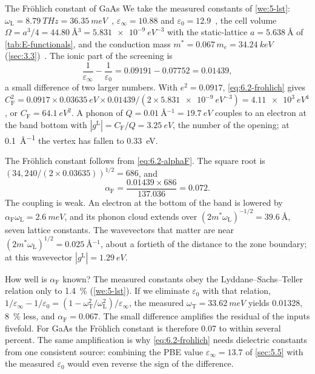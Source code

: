 \begin{workedexample}{The Fr\"ohlich constant of GaAs}\label{we:6-frohlich}
We take the measured constants of \cref{we:5-lst}: $\omega_{\mathrm{L}} = \SI{8.79}{THz} = \SI{36.35}{meV}$~\cite{strauch1990phonon}, $\varepsilon_\infty = 10.88$ and $\varepsilon_0 = 12.9$~\cite{lockwood2005optical}, the cell volume $\Omega = a^3/4 = \SI{44.80}{\angstrom^3} = \SI{5.831e-9}{eV^{-3}}$ with the static-lattice $a = \SI{5.638}{\angstrom}$ of \cref{tab:E-functionals}, and the conduction mass $m^* = 0.067\,m_e = \SI{34.24}{keV}$ (\cref{sec:3.3})~\cite{vurgaftman2001band}. The ionic part of the screening is
\begin{equation*}
  \frac{1}{\varepsilon_\infty} - \frac{1}{\varepsilon_0} = 0.09191 - 0.07752 = 0.01439 ,
\end{equation*}
a small difference of two larger numbers. With $e^2 = 0.0917$, \cref{eq:6.2-frohlich} gives $C_{\mathrm{F}}^2 = 0.0917\times\SI{0.03635}{eV}\times0.01439/(2\times\SI{5.831e-9}{eV^{-3}}) = \SI{4.11e3}{eV^4}$, or $C_{\mathrm{F}} = \SI{64.1}{eV^2}$. A phonon of $Q = \SI{0.01}{\angstrom^{-1}} = \SI{19.7}{eV}$ couples to an electron at the band bottom with $|g^{\mathrm{L}}| = C_{\mathrm{F}}/Q = \SI{3.25}{eV}$, the number of the opening; at \SI{0.1}{\angstrom^{-1}} the vertex has fallen to \SI{0.33}{eV}.

The Fr\"ohlich constant follows from \cref{eq:6.2-alphaF}. The square root is $(34{,}240/(2\times0.03635))^{1/2} = 686$, and
\begin{equation*}
  \alpha_{\mathrm{F}} = \frac{0.01439\times686}{137.036} = 0.072 .
\end{equation*}
The coupling is weak. An electron at the bottom of the band is lowered by $\alpha_{\mathrm{F}}\omega_{\mathrm{L}} = \SI{2.6}{meV}$, and its phonon cloud extends over $(2m^*\omega_{\mathrm{L}})^{-1/2} = \SI{39.6}{\angstrom}$, seven lattice constants. The wavevectors that matter are near $(2m^*\omega_{\mathrm{L}})^{1/2} = \SI{0.025}{\angstrom^{-1}}$, about a fortieth of the distance to the zone boundary; at this wavevector $|g^{\mathrm{L}}| = \SI{1.29}{eV}$.

How well is $\alpha_{\mathrm{F}}$ known? The measured constants obey the Lyddane--Sachs--Teller relation only to \SI{1.4}{\percent} (\cref{we:5-lst}). If we eliminate $\varepsilon_0$ with that relation, $1/\varepsilon_\infty - 1/\varepsilon_0 = (1 - \omega_{\mathrm{T}}^2/\omega_{\mathrm{L}}^2)/\varepsilon_\infty$, the measured $\omega_{\mathrm{T}} = \SI{33.62}{meV}$ yields 0.01328, \SI{8}{\percent} less, and $\alpha_{\mathrm{F}} = 0.067$. The small difference amplifies the residual of the inputs fivefold. For GaAs the Fr\"ohlich constant is therefore 0.07 to within several percent. The same amplification is why \cref{eq:6.2-frohlich} needs dielectric constants from one consistent source: combining the PBE value $\varepsilon_\infty = 13.7$ of \cref{sec:5.5} with the measured $\varepsilon_0$ would even reverse the sign of the difference.
\end{workedexample}

